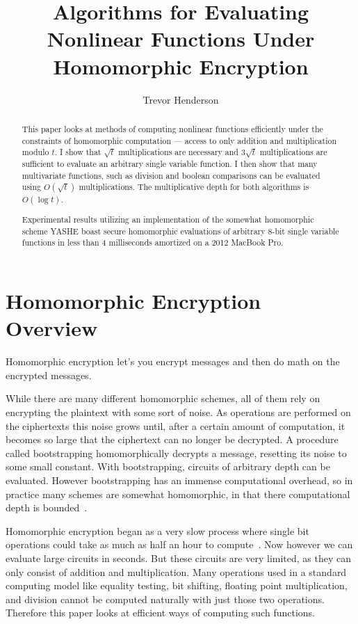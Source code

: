 \documentclass{article}
\title{Algorithms for Evaluating Nonlinear Functions Under Homomorphic Encryption}
\author{Trevor Henderson}
\begin{document}
\maketitle

    \begin{abstract}

        This paper looks at methods of computing nonlinear functions efficiently
        under the constraints of homomorphic computation
        --- access to only addition and multiplication modulo $t$.
        I show that $\sqrt{t}$ multiplications are necessary 
        and $3\sqrt{t}$ multiplications are sufficient to evaluate
        an arbitrary single variable function.
        I then show that many multivariate functions, such as division
        and boolean comparisons can be evaluated using
        $O(\sqrt{t})$ multiplications.
        The multiplicative depth for both algorithms is $O(\log t)$.

        Experimental results utilizing an 
        implementation of the somewhat homomorphic scheme
        YASHE boast
        secure homomorphic evaluations of arbitrary
        8-bit single variable functions 
        in less than 4 milliseconds amortized
        on a 2012 MacBook Pro.
    \end{abstract}

    \section{Homomorphic Encryption Overview}
        Homomorphic encryption let's you encrypt messages
        and then
        do math on the encrypted messages.

        While there are many different homomorphic schemes,
        all of them rely on encrypting the plaintext with some sort of noise.
        As operations are performed on the ciphertexts this noise grows until,
        after a certain amount of computation,
        it becomes so large that the ciphertext can no longer be decrypted.
        A procedure called bootstrapping homomorphically decrypts a message,
        resetting its noise to some small constant.
        With bootstrapping, circuits of arbitrary depth can be evaluated.
        However bootstrapping has an immense computational overhead, 
        so in practice many schemes are somewhat homomorphic, 
        in that there computational depth is bounded~\cite{homenc}.

        Homomorphic encryption began as a very slow process where single 
        bit operations could take as much as half an hour to compute~\cite{firstImp}.
        Now however we can evaluate large circuits in seconds.
        But these circuits are very limited, 
        as they can only
        consist of addition and multiplication.
        Many operations used in a standard computing model
        like equality testing, bit shifting, floating point multiplication,
        and division cannot be computed naturally with just those two operations.
        Therefore this paper looks at efficient ways of computing
        such functions.
\end{document}
